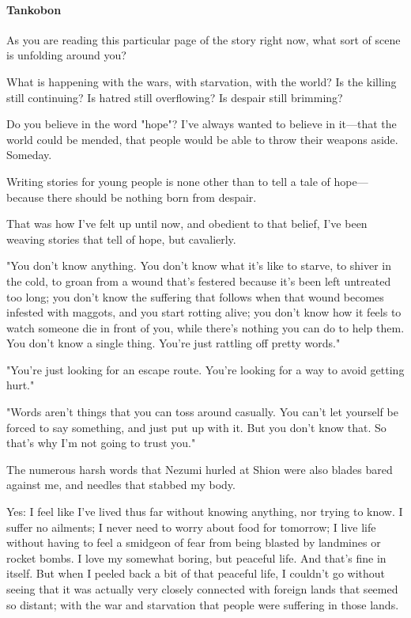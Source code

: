 \paragraph{Tankobon}

As you are reading this particular page of the story right now, what
sort of scene is unfolding around you?

What is happening with the wars, with starvation, with the world? Is the
killing still continuing? Is hatred still overflowing? Is despair still
brimming?

Do you believe in the word "hope"? I've always wanted to believe in
it---that the world could be mended, that people would be able to throw
their weapons aside. Someday.

Writing stories for young people is none other than to tell a tale of
hope---because there should be nothing born from despair.

That was how I've felt up until now, and obedient to that belief, I've
been weaving stories that tell of hope, but cavalierly.

"You don't know anything. You don't know what it's like to starve, to
shiver in the cold, to groan from a wound that's festered because it's
been left untreated too long; you don't know the suffering that follows
when that wound becomes infested with maggots, and you start rotting
alive; you don't know how it feels to watch someone die in front of you,
while there's nothing you can do to help them. You don't know a single
thing. You're just rattling off pretty words."

"You're just looking for an escape route. You're looking for a way to
avoid getting hurt."

"Words aren't things that you can toss around casually. You can't let
yourself be forced to say something, and just put up with it. But you
don't know that. So that's why I'm not going to trust you."

The numerous harsh words that Nezumi hurled at Shion were also blades
bared against me, and needles that stabbed my body.

Yes: I feel like I've lived thus far without knowing anything, nor
trying to know. I suffer no ailments; I never need to worry about food
for tomorrow; I live life without having to feel a smidgeon of fear from
being blasted by landmines or rocket bombs. I love my somewhat boring,
but peaceful life. And that's fine in itself. But when I peeled back a
bit of that peaceful life, I couldn't go without seeing that it was
actually very closely connected with foreign lands that seemed so
distant; with the war and starvation that people were suffering in those
lands.

